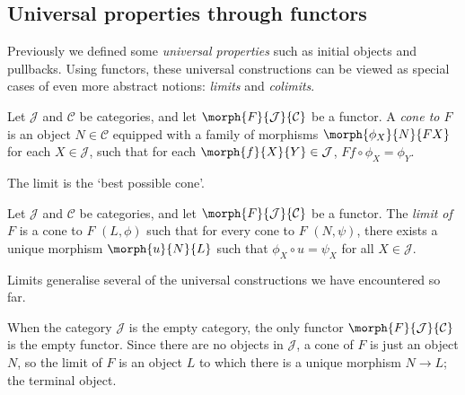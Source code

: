 \subsection{Universal properties through functors}

Previously we defined some \emph{universal properties} such as initial
objects and pullbacks.
Using functors, these universal constructions can be viewed as special cases of
even more abstract notions: \emph{limits} and \emph{colimits}.

\begin{definition}[Cone]
    Let \(\mathcal{J}\) and \(\mathcal{C}\) be categories, and let
    \(\morph{F}{\mathcal{J}}{\mathcal{C}}\) be a functor.
    A \emph{cone to \(F\)} is an object \(N \in \mathcal{C}\) equipped with
    a family of morphisms \(\morph{\phi_X}{N}{FX}\) for each
    \(X \in \mathcal{J}\), such that for each
    \(\morph{f}{X}{Y} \in \mathcal{J}\),
    \(Ff \circ \phi_X = \phi_Y\).
    \begin{center}
        
    \end{center}
\end{definition}

The limit is the `best possible cone'.

\begin{definition}[Limit]
    Let \(\mathcal{J}\) and \(\mathcal{C}\) be categories, and let
    \(\morph{F}{\mathcal{J}}{\mathcal{C}}\) be a functor.
    The \emph{limit of \(F\)} is a cone to \(F\) \((L,\phi) \) such that for
    every cone to \(F\) \((N, \psi)\), there exists a unique morphism
    \(\morph{u}{N}{L}\) such that \(\phi_X \circ u = \psi_X\) for all
    \(X \in \mathcal{J}\).
    \begin{center}
        
    \end{center}
\end{definition}

Limits generalise several of the universal constructions we have encountered so
far.

\begin{example}\label{ex:terminal-limit}
    When the category \(\mathcal{J}\) is the empty category, the only functor
    \(\morph{F}{\mathcal{J}}{\mathcal{C}}\) is the empty functor.
    Since there are no objects in \(\mathcal{J}\), a cone of \(F\) is just an
    object \(N\), so the limit of \(F\) is an object \(L\) to which there is a
    unique morphism \(N \to L\); the terminal object.

\end{example}


